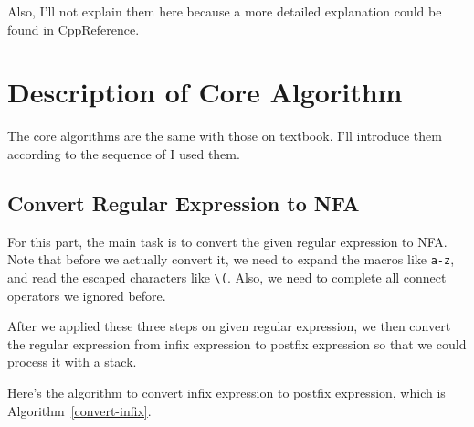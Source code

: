 \documentclass{article}
\begin{document}
Also, I'll not explain them here because a more detailed explanation could be found in CppReference.

\section{Description of Core Algorithm}

The core algorithms are the same with those on textbook. I'll introduce them according to the sequence of I used them.

\subsection{Convert Regular Expression to NFA}

For this part, the main task is to convert the given regular expression to NFA. Note that before we actually convert it, we need to expand the macros like \texttt{a-z}, and read the escaped characters like \texttt{\textbackslash (}. Also, we need to complete all connect operators we ignored before.

After we applied these three steps on given regular expression, we then convert the regular expression from infix expression to postfix expression so that we could process it with a stack.

Here's the algorithm to convert infix expression to postfix expression, which is Algorithm~\ref{convert-infix}.
\end{document}

